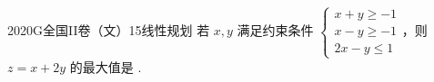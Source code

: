 
\begin{problem}{2020}{G}{全国II卷（文）}{15}{线性规划}
若 $ x,y $ 满足约束条件 $ \begin{cases} x+y\geqslant -1 \\ x-y\geqslant -1 \\ 2x-y\leqslant 1 \end{cases} $，则 $ z=x+2y $ 的最大值是 \underline{\hspace{4em}}.
\end{problem}

\begin{answer}

\end{answer}

\begin{solutions}

\end{solutions}